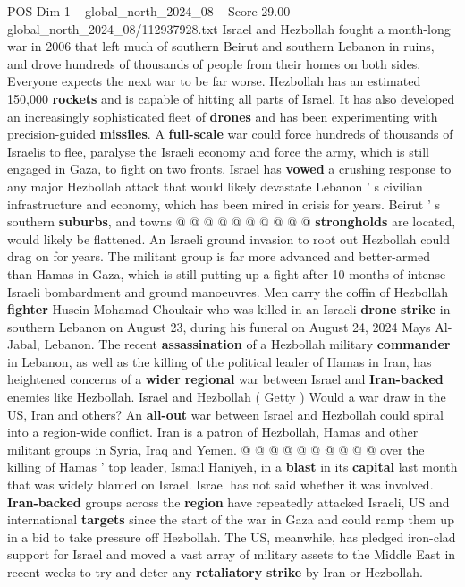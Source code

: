 \begin{textsample}{POS Dim 1 – global\_north\_2024\_08 – Score 29.00 – global\_north\_2024\_08/112937928.txt}
Israel and Hezbollah fought a month-long war in 2006 that left much of southern Beirut and southern Lebanon in ruins, and drove hundreds of thousands of people from their homes on both sides.
Everyone expects the next war to be far worse.
Hezbollah has an estimated 150,000 \textbf{rockets} and is capable of hitting all parts of Israel.
It has also developed an increasingly sophisticated fleet of \textbf{drones} and has been experimenting with precision-guided \textbf{missiles}.
A \textbf{full-scale} war could force hundreds of thousands of Israelis to flee, paralyse the Israeli economy and force the army, which is still engaged in Gaza, to fight on two fronts.
Israel has \textbf{vowed} a crushing response to any major Hezbollah attack that would likely devastate Lebanon ' s civilian infrastructure and economy, which has been mired in crisis for years.
Beirut ' s southern \textbf{suburbs}, and towns @ @ @ @ @ @ @ @ @ @ \textbf{strongholds} are located, would likely be flattened.
An Israeli ground invasion to root out Hezbollah could drag on for years.
The militant group is far more advanced and better-armed than Hamas in Gaza, which is still putting up a fight after 10 months of intense Israeli bombardment and ground manoeuvres.
Men carry the coffin of Hezbollah \textbf{fighter} Husein Mohamad Choukair who was killed in an Israeli \textbf{drone} \textbf{strike} in southern Lebanon on August 23, during his funeral on August 24, 2024 Mays Al-Jabal, Lebanon.
The recent \textbf{assassination} of a Hezbollah military \textbf{commander} in Lebanon, as well as the killing of the political leader of Hamas in Iran, has heightened concerns of a \textbf{wider} \textbf{regional} war between Israel and \textbf{Iran-backed} enemies like Hezbollah.
Israel and Hezbollah ( Getty ) Would a war draw in the US, Iran and others?
An \textbf{all-out} war between Israel and Hezbollah could spiral into a region-wide conflict.
Iran is a patron of Hezbollah, Hamas and other militant groups in Syria, Iraq and Yemen. @ @ @ @ @ @ @ @ @ @ over the killing of Hamas ' top leader, Ismail Haniyeh, in a \textbf{blast} in its \textbf{capital} last month that was widely blamed on Israel.
Israel has not said whether it was involved. \textbf{Iran-backed} groups across the \textbf{region} have repeatedly attacked Israeli, US and international \textbf{targets} since the start of the war in Gaza and could ramp them up in a bid to take pressure off Hezbollah.
The US, meanwhile, has pledged iron-clad support for Israel and moved a vast array of military assets to the Middle East in recent weeks to try and deter any \textbf{retaliatory} \textbf{strike} by Iran or Hezbollah.

\end{textsample}

